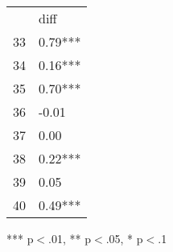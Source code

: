 \documentclass{article}
\begin{document}
\begin{table}[!h]
\centering
\begin{tabular}{ll}
\cline{1-2}
\multicolumn{1}{|l}{} &
  \multicolumn{1}{|l|}{diff} \\
\cline{1-2}
\multicolumn{1}{|l}{33} &
  \multicolumn{1}{|l|}{0.79***} \\
\cline{1-2}
\multicolumn{1}{|l}{34} &
  \multicolumn{1}{|l|}{0.16***} \\
\cline{1-2}
\multicolumn{1}{|l}{35} &
  \multicolumn{1}{|l|}{0.70***} \\
\cline{1-2}
\multicolumn{1}{|l}{36} &
  \multicolumn{1}{|l|}{-0.01} \\
\cline{1-2}
\multicolumn{1}{|l}{37} &
  \multicolumn{1}{|l|}{0.00} \\
\cline{1-2}
\multicolumn{1}{|l}{38} &
  \multicolumn{1}{|l|}{0.22***} \\
\cline{1-2}
\multicolumn{1}{|l}{39} &
  \multicolumn{1}{|l|}{0.05} \\
\cline{1-2}
\multicolumn{1}{|l}{40} &
  \multicolumn{1}{|l|}{0.49***} \\
\cline{1-2}
\end{tabular}

\footnotesize{
*** p$<$.01, ** p$<$.05, * p$<$.1
}
\end{table}
\end{document}
